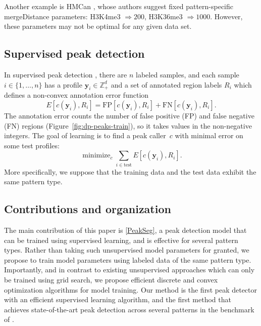 \documentclass{article}
\DeclareMathOperator*{\minimize}{minimize}
\newcommand{\ZZ}{\mathbb Z}
\begin{document}
Another example is HMCan \citep{HMCan}, whose authors suggest fixed
pattern-specific mergeDistance parameters: H3K4me3 $\Rightarrow 200$,
H3K36me3 $\Rightarrow 1000$. However, these parameters may not be
optimal for any given data set.

\subsection{Supervised peak detection}

In supervised peak detection \citep{hocking2014visual}, there
are $n$ labeled samples, and each sample $i\in\{1, \dots, n\}$ has a
profile $\mathbf y_i\in\ZZ_+^d$ and a set of annotated region labels $R_i$
which defines a non-convex annotation error function
\begin{equation}
  \label{eq:error}
  E[c(\mathbf y_i),  R_i] =
  \text{FP}[c(\mathbf y_i), R_i] +
  \text{FN}[c(\mathbf y_i), R_i].
\end{equation}
The annotation error counts the number of false positive (FP) and
false negative (FN) regions (Figure~\ref{fig:dp-peaks-train}), so it
takes values in the non-negative integers. The goal of learning is to
find a peak caller~$c$ with minimal error on some test profiles:
\begin{equation}
  \label{eq:min_error}
  \minimize_c \sum_{i\in\text{test}} E[c(\mathbf y_i),  R_i].
\end{equation}
More specifically, we suppose that the training data and the test data
exhibit the same pattern type.


\subsection{Contributions and organization}

The main contribution of this paper is \ref{PeakSeg}, a peak detection
model that can be trained using supervised learning, and is effective
for several pattern types. Rather than taking such unsupervised model
parameters for granted, we propose to train model parameters using
labeled data of the same pattern type. Importantly, and in contrast to
existing unsupervised approaches which can only be trained using grid
search, we propose efficient discrete and convex optimization
algorithms for model training. Our method is the first peak detector
with an efficient supervised learning algorithm, and the first method
that achieves state-of-the-art peak detection across several 
patterns in the benchmark of \citet{hocking2014visual}.
\end{document}
